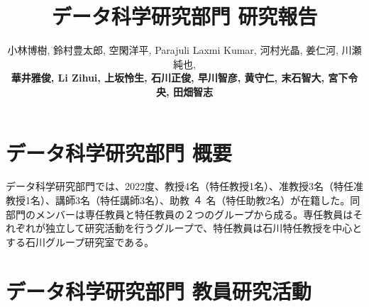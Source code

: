 \documentclass[11pt]{jarticle}
\title{データ科学研究部門 研究報告}
\author{小林博樹, 鈴村豊太郎, 空閑洋平, Parajuli Laxmi Kumar, 河村光晶, 姜仁河, 川瀬純也, \\
\textbf{華井雅俊, Li Zihui, 上坂怜生, 石川正俊, 早川智彦, 黄守仁, 末石智大, 宮下令央, 田畑智志}}
\begin{document}
\maketitle

\section{データ科学研究部門 概要}
データ科学研究部門では、2022度、教授4名（特任教授1名）、准教授3名（特任准教授1名）、講師3名（特任講師3名）、助教 ４ 名（特任助教2名）が在籍した。同部門のメンバーは専任教員と特任教員の２つのグループから成る。専任教員はそれぞれが独立して研究活動を行うグループで、特任教員は石川特任教授を中心とする石川グループ研究室である。

%

%

\section{データ科学研究部門 教員研究活動}
\end{document}
